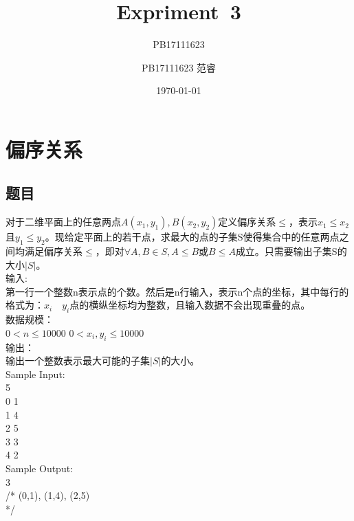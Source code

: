 \documentclass[UTF8]{ctexart}
\title{Expriment\ 3}
\author{PB17111623}
\author{PB17111623 范睿}
\date{\today}
\begin{document}
\maketitle
\section{偏序关系}
\subsection{题目}
对于二维平面上的任意两点$A(x_1,y_1),B(x_2,y_2)$定义偏序关系$\leq$，表示$x_1 \leq x_2$ 且$y_1\leq y_2$​。现给定平面上的若干点，求最大的点的子集S使得集合中的任意两点之间均满足偏序关系$\leq$，即对$\forall A,B \in S, A\leq B$或$B\leq A$成立。只需要输出子集S的大小$|S|$。\\

输入:\\
第一行一个整数n表示点的个数。然后是n行输入，表示n个点的坐标，其中每行的格式为：$x_i\quad y_i$点的横纵坐标均为整数，且输入数据不会出现重叠的点。\\

数据规模：\\
$0< n\leq 10000$
$0<x_i,y_i\leq 10000$\\

输出：\\
输出一个整数表示最大可能的子集$|S|$的大小。\\

Sample Input:\\ 
5\\
0 1\\
1 4\\
2 5\\
3 3\\
4 2\\

Sample Output:\\
3\\
/*
{(0,1), (1,4), (2,5)}\\
*/\\
\end{document}
